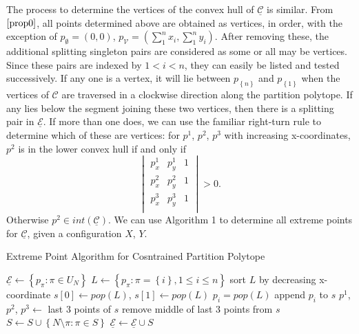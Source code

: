 \documentclass{article}
\theoremstyle{case}
\begin{document}
The process to determine the vertices of the convex hull of $\underline{\mathcal{C}}$ is similar. From $\ref{prop0}$, all points determined above are obtained as vertices, in order, with the exception of $p_{\emptyset} = \left( 0,0\right)$, $p_\mathcal{V} = \left( \sum_{1}^n x_i, \sum_{1}^n y_i\right)$. After removing these, the additional splitting singleton pairs are considered as some or all may be vertices. Since these pairs are indexed by $1 < i < n$, they can easily be listed and tested successively. If any one is a vertex, it will lie between $p_{\left\lbrace n\right\rbrace}$ and $p_{\left\lbrace 1\right\rbrace}$ when the vertices of $\mathcal{C}$ are traversed in a clockwise direction along the partition polytope. If any lies below the segment joining these two vertices, then there is a splitting pair in $\underline{\mathcal{E}}$. If more than one does, we can use the familiar right-turn rule to determine which of these are vertices: for $p^1$, $p^2$, $p^3$ with increasing x-coordinates, $p^2$ is in the lower convex hull if and only if
\[
\begin{vmatrix} \label{eq8}
p_x^1 & p_y^1 & 1\\
p_x^2 & p_y^2 & 1\\
p_x^3 & p_y^3 & 1\\
\end{vmatrix} > 0.
\]
Otherwise $p^2 \in int\left( \underline{\mathcal{C}}\right)$. We can use Algorithm 1 to determine all extreme points for $\underline{\mathcal{C}}$, given a configuration $X$, $Y$.

\begin{algorithm}
\caption{Extreme Point Algorithm for Cosntrained Partition Polytope }
\begin{algorithmic}[1]
\State $\underline{\mathcal{E}} \leftarrow \left\lbrace p_{\pi} \colon \pi \in U_N\right\rbrace$
\State $L \leftarrow \left\lbrace p_{\pi} \colon \pi = \left\lbrace i\right\rbrace, 1 \leq i \leq n\right\rbrace$
\State sort $L$ by decreasing x-coordinate
\State $s[0] \leftarrow \textit{pop}\left( L\right)$, $s[1] \leftarrow \textit{pop}\left( L\right)$
\State $p_i = \textit{pop}\left( L\right)$
\State append $p_i$ to $s$
\State $p^1$, $p^2$, $p^3 \leftarrow$ last 3 points of $s$
\State remove middle of last 3 points from $s$
\EndIf
\EndFor
\State $S \leftarrow S \cup \left\lbrace N\setminus \pi \colon \pi \in S\right\rbrace$
\State $\underline{\mathcal{E}} \leftarrow \underline{\mathcal{E}} \cup S$\
\end{algorithmic}
\end{algorithm}
\end{document}

